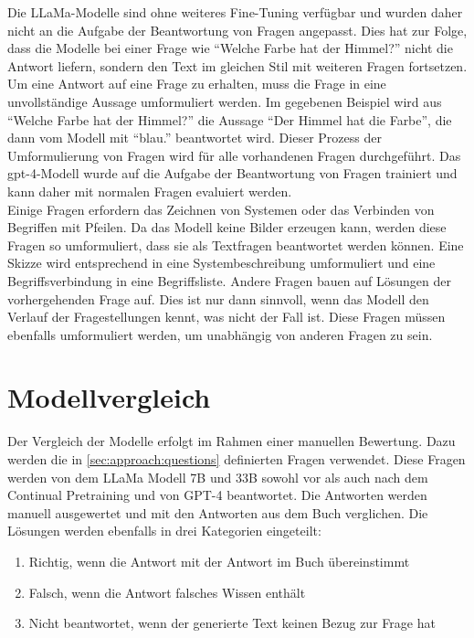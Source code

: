 Die LLaMa-Modelle sind ohne weiteres Fine-Tuning verfügbar und wurden daher nicht an die Aufgabe der Beantwortung von Fragen angepasst.
Dies hat zur Folge, dass die Modelle bei einer Frage wie \enquote{Welche Farbe hat der Himmel?} nicht die Antwort liefern, sondern den Text im gleichen Stil mit weiteren Fragen fortsetzen.
Um eine Antwort auf eine Frage zu erhalten, muss die Frage in eine unvollständige Aussage umformuliert werden.
Im gegebenen Beispiel wird aus \enquote{Welche Farbe hat der Himmel?} die Aussage \enquote{Der Himmel hat die Farbe}, die dann vom Modell mit \enquote{blau.} beantwortet wird.
Dieser Prozess der Umformulierung von Fragen wird für alle vorhandenen Fragen durchgeführt.
Das \ac{gpt}-4-Modell wurde auf die Aufgabe der Beantwortung von Fragen trainiert und kann daher mit normalen Fragen evaluiert werden.\\

Einige Fragen erfordern das Zeichnen von Systemen oder das Verbinden von Begriffen mit Pfeilen.
Da das Modell keine Bilder erzeugen kann, werden diese Fragen so umformuliert, dass sie als Textfragen beantwortet werden können.
Eine Skizze wird entsprechend in eine Systembeschreibung umformuliert und eine Begriffsverbindung in eine Begriffsliste.
Andere Fragen bauen auf Lösungen der vorhergehenden Frage auf.
Dies ist nur dann sinnvoll, wenn das Modell den Verlauf der Fragestellungen kennt, was nicht der Fall ist.
Diese Fragen müssen ebenfalls umformuliert werden, um unabhängig von anderen Fragen zu sein.

\section{Modellvergleich}
Der Vergleich der Modelle erfolgt im Rahmen einer manuellen Bewertung.
Dazu werden die in \cref{sec:approach:questions} definierten Fragen verwendet.
Diese Fragen werden von dem LLaMa Modell 7B und 33B sowohl vor als auch nach dem Continual Pretraining und von GPT-4 beantwortet.
Die Antworten werden manuell ausgewertet und mit den Antworten aus dem Buch \citet{bb} verglichen.
Die Lösungen werden ebenfalls in drei Kategorien eingeteilt:
\begin{enumerate}
    \item Richtig, wenn die Antwort mit der Antwort im Buch übereinstimmt
    \item Falsch, wenn die Antwort falsches Wissen enthält
    \item Nicht beantwortet, wenn der generierte Text keinen Bezug zur Frage hat
\end{enumerate}

